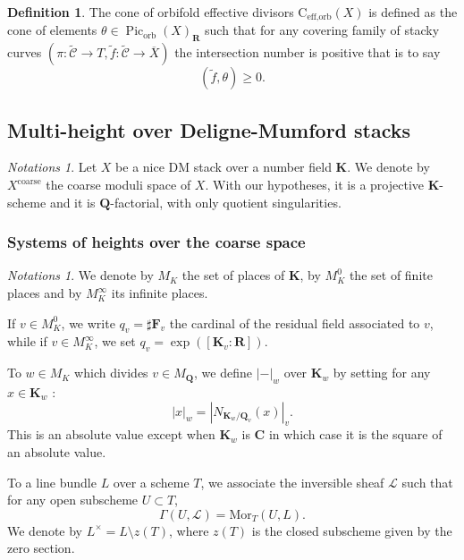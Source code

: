 \documentclass{proc-l}
\newcommand{\R}{\mathbf{R}}
\newcommand{\C}{\mathbf{C}}
\newcommand{\K}{\mathbf{K}}
\newcommand{\Q}{\mathbf{Q}}
\newcommand{\F}{\mathbf{F}}
\newcommand{\coneorb}{\text{C}_{\text{eff},\text{orb}}(X)}
\DeclareMathOperator{\Pic}{Pic}
\DeclareMathOperator{\coarse}{coarse}
\DeclareMathOperator{\orb}{orb}
\newcommand{\sheafL}{\mathcal{L}}
\theoremstyle{definition}
\newtheorem{definition}[theorem]{Definition}
\theoremstyle{remark}
\newtheorem{Notations}[theorem]{Notations}
\numberwithin{equation}{section}
\begin{document}
\begin{definition}\label{definition_cone_orbifold_effective_divisors}
    The cone of orbifold effective divisors $\coneorb$ is defined as the cone of elements $\theta \in \Pic_{\orb}(X)_{\R}$ such that for any covering family of stacky curves $\left( \pi : \tilde{\mathcal{C}} \rightarrow T,  \tilde{f} : \tilde{\mathcal{C}} \rightarrow \overline{X} \right)$ the intersection number is positive that is to say $$( \tilde{f},\theta) \geqslant 0 .$$
\end{definition}


\subsection{Multi-height over Deligne-Mumford stacks}

\begin{Notations}
   Let $X$ be a nice DM stack over a number field $\K$. We denote by $X^{\coarse}$ the coarse moduli space of $X$. With our hypotheses, it is a projective $\K$-scheme and it is $\Q$-factorial, with only quotient singularities.
\end{Notations}


\subsubsection{Systems of heights over the coarse space}

\begin{Notations}
    We denote by $M_K$ the set of places of $\K$, by $M_K^0$ the set of finite places and by $M_K^{\infty}$ its infinite places.

    If $v \in M_K^0$, we write $q_v = \sharp \F_v$ the cardinal of the residual field associated to $v$, while if $v \in M_K^{\infty}$, we set $q_v = \exp([\K_v:\R])$.

    To $w \in M_K$ which divides $v \in M_{\Q}$, we define $|-|_w $ over $\K_w$ by setting for any $x \in \K_w$ :
    $$ | x |_w = | N_{\K_w/\Q_v}(x) |_v .$$This is an absolute value except when $\K_w$ is $\C$ in which case it is the square of an absolute value.

    To a line bundle $L$ over a scheme $T$, we associate the inversible sheaf $\sheafL$ such that for any open subscheme $U \subset T$, $$\Gamma(U,\sheafL) = \text{Mor}_T(U,L) .$$We denote by $L^{\times} = L \setminus z(T)$, where $z(T)$ is the closed subscheme given by the zero section.
\end{Notations}
\end{document}
